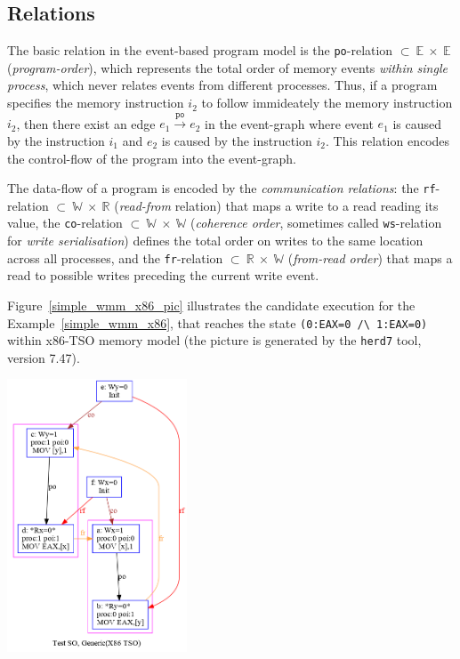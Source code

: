 \subsection{Relations}
\label{ch:wmm:model:relations}

The basic relation in the event-based program model is the \texttt{po}-relation $\subset~\mathbb{E}~\times~\mathbb{E}$ (\textit{program-order}), which represents the total order of memory events \textit{within single process}, which never relates events from different processes. Thus, if a program specifies the memory instruction $i_2$ to follow immideately the memory instruction $i_2$, then there exist an edge $e_1 \xrightarrow{\texttt{po}} e_2$ in the event-graph where event $e_1$ is caused by the instruction $i_1$ and $e_2$ is caused by the instruction $i_2$. This relation encodes the control-flow of the program into the event-graph.

The data-flow of a program is encoded by the \textit{communication relations}: the \texttt{rf}-relation $\subset~\mathbb{W}~\times~\mathbb{R}$ (\textit{read-from} relation) that maps a write to a read reading its value, the \texttt{co}-relation $\subset~\mathbb{W}~\times~\mathbb{W}$ (\textit{coherence order}, sometimes called \texttt{ws}-relation for \textit{write serialisation}) defines the total order on writes to the same location across all processes, and the \texttt{fr}-relation $\subset~\mathbb{R}~\times~\mathbb{W}$ (\textit{from-read order}) that maps a read to possible writes preceding the current write event.

Figure~\ref{simple_wmm_x86_pic} illustrates the candidate execution for the Example~\ref{simple_wmm_x86}, that reaches the state \texttt{(0:EAX=0~/\textbackslash~1:EAX=0)} within x86-TSO memory model (the picture is generated by the \texttt{herd7} tool, version 7.47). 

\includegraphics[width=0.4\textwidth]{img/my/simple_wmm_x86.png}
\label{simple_wmm_x86_pic}

